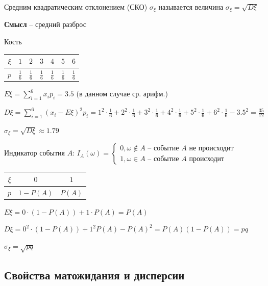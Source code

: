 \documentclass[12pt]{article}
\begin{document}
    \Defs Средним квадратическим отклонением (СКО) $\sigma_\xi$ называется величина $\sigma_\xi = \sqrt{D\xi}$

    \textbf{Смысл} -- средний разброс

     Кость

    \smallvspace


    \begin{tabular}{c|c|c|c|c|c|c}
        $\xi$ & $1$           & $2$           & $3$           & $4$           & $5$           & $6$           \\
        \hline
        $p$   & $\frac{1}{6}$ & $\frac{1}{6}$ & $\frac{1}{6}$ & $\frac{1}{6}$ & $\frac{1}{6}$ & $\frac{1}{6}$
    \end{tabular}


    $E\xi = \sum_{i = 1}^6 x_i p_i = 3.5$ (в данном случае ср. арифм.)

    $D\xi = \sum_{i = 1}^6 (x_i - E\xi)^2 p_i = 1^2 \cdot \frac{1}{6} + 2^2 \cdot \frac{1}{6} + 3^2 \cdot \frac{1}{6} + 4^2 \cdot \frac{1}{6} + 5^2 \cdot \frac{1}{6} + 6^2 \cdot \frac{1}{6} - 3.5^2 = \frac{35}{12} $

    $\sigma_\xi = \sqrt{D\xi} \approx 1.79$

     Индикатор события $A$: $I_A (\omega) = \begin{cases}
                                                       0, \omega \notin A \text{ -- событие } A \text{ не происходит} \\ 1, \omega \in A \text{ -- событие } A \text{ происходит}
    \end{cases}$

    \begin{tabular}{c|c|c}
        $\xi$ & $0$        & $1$    \\
        \hline
        $p$   & $1 - P(A)$ & $P(A)$
    \end{tabular}

    $E\xi = 0 \cdot (1 - P(A)) + 1 \cdot P(A) = P(A)$

    $D\xi = 0^2 \cdot (1 - P(A)) + 1^2 P(A) - P(A)^2 = P(A) (1 - P(A)) = pq$

    $\sigma_\xi = \sqrt{pq}$

    \hypertarget{expectedvalueandvarianceproperties}{}

    \subsection{Свойства матожидания и дисперсии}
\end{document}
